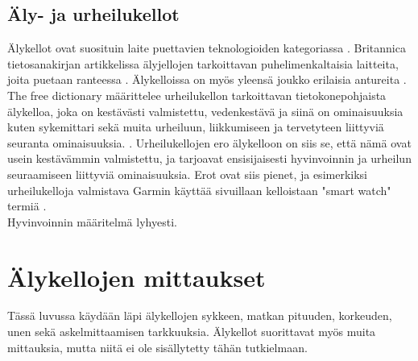 \documentclass[utf8,bachelor,finnish]{bachelor}
\begin{document}
  \section{Äly- ja urheilukellot}
  Älykellot ovat suosituin laite puettavien teknologioiden kategoriassa \parencite{godfrey2018z}. Britannica
   tietosanakirjan artikkelissa älyjellojen tarkoittavan puhelimenkaltaisia laitteita, joita puetaan ranteessa \parencite{Gregersen_watch_2023}.
    Älykelloissa on myös yleensä joukko erilaisia antureita \parencite{rawassizadeh_wearables_2014}.\\

  The free dictionary määrittelee urheilukellon tarkoittavan tietokonepohjaista älykelloa, joka on kestävästi valmistettu, vedenkestävä ja siinä on ominaisuuksia kuten
    sykemittari sekä muita urheiluun, liikkumiseen ja tervetyteen liittyviä seuranta ominaisuuksia. \parencite{sportswatch_tfd}. Urheilukellojen ero älykelloon on siis se,
     että nämä ovat usein kestävämmin valmistettu, ja tarjoavat ensisijaisesti hyvinvoinnin ja urheilun seuraamiseen liittyviä ominaisuuksia. Erot ovat siis pienet, 
      ja esimerkiksi urheilukelloja valmistava Garmin käyttää sivuillaan kelloistaan "smart watch" termiä \parencite{garmin_site}. \\
  
Hyvinvoinnin määritelmä lyhyesti.


  \chapter{Älykellojen mittaukset}
  Tässä luvussa käydään läpi älykellojen sykkeen, matkan pituuden, korkeuden, unen sekä askelmittaamisen tarkkuuksia.
   Älykellot suorittavat myös muita mittauksia, mutta niitä ei ole sisällytetty tähän tutkielmaan.
\end{document}
